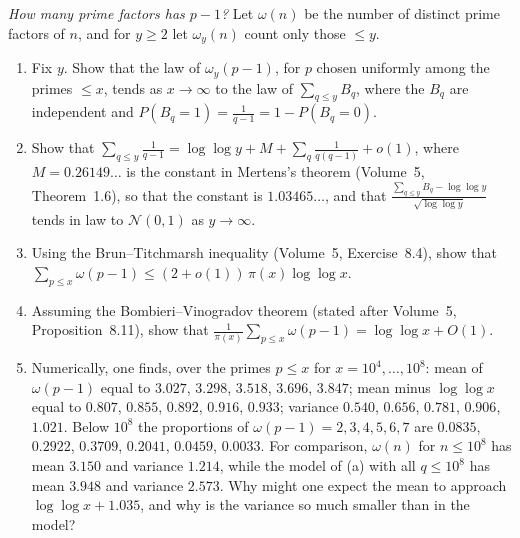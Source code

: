 \begin{exercise}[Journey]\label{pb:shifted}
\emph{How many prime factors has $p-1$?} Let $\omega(n)$ be the number of distinct prime factors of $n$, and for $y\ge2$ let $\omega_y(n)$ count only those $\le y$.
\begin{enumerate}[label=(\alph*)]
\item Fix $y$. Show that the law of $\omega_y(p-1)$, for $p$ chosen uniformly among the primes $\le x$, tends as $x\to\infty$ to the law of $\sum_{q\le y}B_q$, where the
$B_q$ are independent and $P(B_q=1)=\frac1{q-1}=1-P(B_q=0)$.
\item Show that $\sum_{q\le y}\frac1{q-1}=\log\log y+M+\sum_q\frac1{q(q-1)}+o(1)$, where $M=0.26149\ldots$ is the constant in Mertens's theorem (Volume~5, Theorem~1.6),
so that the constant is $1.03465\ldots$, and that $\frac{\sum_{q\le y}B_q-\log\log y}{\sqrt{\log\log y}}$ tends in law to $\mathcal N(0,1)$ as $y\to\infty$.
\item Using the Brun--Titchmarsh inequality (Volume~5, Exercise~8.4), show that $\sum_{p\le x}\omega(p-1)\le(2+o(1))\,\pi(x)\log\log x$.
\item Assuming the Bombieri--Vinogradov theorem (stated after Volume~5, Proposition~8.11), show that $\frac1{\pi(x)}\sum_{p\le x}\omega(p-1)=\log\log x+O(1)$.
\item Numerically, one finds, over the primes $p\le x$ for $x=10^4,\dots,10^8$: mean of $\omega(p-1)$ equal to $3.027$, $3.298$, $3.518$, $3.696$, $3.847$; mean minus
$\log\log x$ equal to $0.807$, $0.855$, $0.892$, $0.916$, $0.933$; variance $0.540$, $0.656$, $0.781$, $0.906$, $1.021$. Below $10^8$ the proportions of
$\omega(p-1)=2,3,4,5,6,7$ are $0.0835$, $0.2922$, $0.3709$, $0.2041$, $0.0459$, $0.0033$. For comparison, $\omega(n)$ for $n\le10^8$ has mean $3.150$ and variance $1.214$,
while the model of (a) with all $q\le10^8$ has mean $3.948$ and variance $2.573$. Why might one expect the mean to approach $\log\log x+1.035$, and why is the variance
so much smaller than in the model?
\end{enumerate}
\end{exercise}

